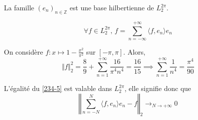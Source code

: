 
  \begin{theorem}
    La famille $(e_n)_{n \in \mathbb{Z}}$ est une base hilbertienne de $L_2^{2 \pi}$.
  \end{theorem}

  \begin{corollary}
    \label{234-5}
    \[ \forall f \in L_2^{2 \pi}, \, f = \sum_{n = -\infty}^{+\infty} \langle f, e_n \rangle e_n \]
  \end{corollary}


  \begin{example}
    On considère $f : x \mapsto 1 - \frac{x^2}{\pi^2}$ sur $[-\pi, \pi]$. Alors,
    \[ \Vert f \Vert^2_2 = \frac{8}{9} + \sum_{n=1}^{+\infty} \frac{16}{\pi^4 n^4} = \frac{16}{15} \implies \sum_{n=1}^{+\infty} \frac{1}{n^4} = \frac{\pi^4}{90} \]
  \end{example}


  \begin{remark}
    L'égalité du \cref{234-5} est valable dans $L_2^{2\pi}$, elle signifie donc que
    \[ \left\Vert \sum_{n = -N}^{N} \langle f, e_n \rangle e_n - f \right\Vert_2 \longrightarrow_{N \rightarrow +\infty} 0 \]
  \end{remark}

